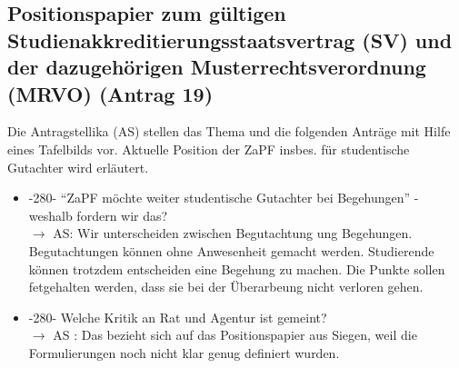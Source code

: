   \subsection{Positionspapier zum gültigen Studienakkreditierungsstaatsvertrag (SV) und der dazugehörigen Musterrechtsverordnung (MRVO) (Antrag 19)}
    Die Antragstellika (AS) stellen das Thema und die folgenden Anträge mit Hilfe eines Tafelbilds vor.
    Aktuelle Position der ZaPF insbes. für studentische Gutachter wird erläutert.

    \begin{itemize}
      \item -280- ``ZaPF möchte weiter studentische Gutachter bei Begehungen'' - weshalb fordern wir das? \\
        $\rightarrow$ AS: Wir unterscheiden zwischen Begutachtung ung Begehungen. Begutachtungen können ohne Anwesenheit gemacht werden. Studierende können trotzdem entscheiden eine Begehung zu machen. Die Punkte sollen fetgehalten werden, dass sie bei der Überarbeung nicht verloren gehen.

      \item -280- Welche Kritik an Rat und Agentur ist gemeint? \\
        $\rightarrow$ AS : Das bezieht sich auf das Positionspapier aus Siegen, weil die Formulierungen noch nicht klar genug definiert wurden.


\end{itemize}
